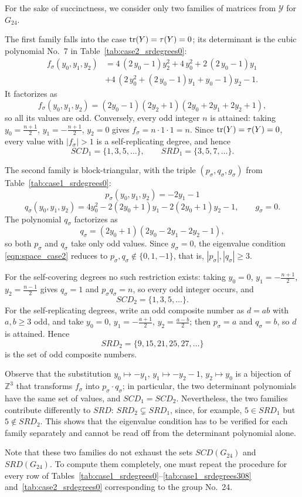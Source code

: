 For the sake of succinctness, we consider only two families of matrices from $\mathcal{Y}$ for $G_{24}$.

The first family falls into the case $\operatorname{tr}(Y) = \tau(Y) = 0$; its determinant is the cubic polynomial
No.~7 in Table~\ref{tab:case2_srdegrees0}:
\begin{align*}
f_\sigma(y_0, y_1, y_2) &= 4 \, {\left(2 \, y_{0} - 1\right)} y_{2}^{2} + 4 \, y_{0}^{2} + 2 \, {\left(2 \, y_{0} - 1\right)} y_{1} \\
& + 4 \, {\left(2 \, y_{0}^{2} + {\left(2 \, y_{0} - 1\right)} y_{1} + y_{0} - 1\right)} y_{2} - 1.
\end{align*}
It factorizes as
$$
f_\sigma(y_0, y_1, y_2) = (2y_0 - 1)(2y_2 + 1)(2y_0 + 2y_1 + 2y_2 + 1),
$$
so all its values are odd. Conversely, every odd integer $n$ is attained: taking
$y_0 = \frac{n+1}{2}$, $y_1 = -\frac{n+1}{2}$, $y_2 = 0$ gives $f_\sigma = n \cdot 1 \cdot 1 = n$.
Since $\operatorname{tr}(Y) = \tau(Y) = 0$, every value with $|f_\sigma| > 1$ is a self-replicating degree, and hence
$$
SCD_1 = \{1, 3, 5, \dots\}, \qquad SRD_1 = \{3, 5, 7, \dots\}.
$$

The second family is block-triangular, with the triple $(p_\sigma, q_\sigma, g_\sigma)$ from
Table~\ref{tab:case1_srdegrees0}:
$$
p_\sigma(y_0, y_1, y_2) = -2 y_1 - 1
$$
$$
q_\sigma(y_0, y_1, y_2) = 4 y_0^2 - 2(2 y_0 + 1) y_1 - 2 (2 y_0 + 1) y_2 - 1, \qquad
g_\sigma = 0.
$$
The polynomial $q_\sigma$ factorizes as
$$
q_\sigma = (2y_0 + 1)(2y_0 - 2y_1 - 2y_2 - 1),
$$
so both $p_\sigma$ and $q_\sigma$ take only odd values. Since $g_\sigma = 0$, the eigenvalue condition
\eqref{eqn:space_case2} reduces to $p_\sigma, q_\sigma \notin \{0, 1, -1\}$, that is,
$|p_\sigma|, |q_\sigma| \ge 3$.

For the self-covering degrees no such restriction exists: taking $y_0 = 0$, $y_1 = -\frac{n+1}{2}$,
$y_2 = \frac{n-1}{2}$ gives $q_\sigma = 1$ and $p_\sigma q_\sigma = n$, so every odd integer occurs, and
$$
SCD_2 = \{1, 3, 5, \dots\}.
$$
For the self-replicating degrees, write an odd composite number as $d = ab$ with $a, b \ge 3$ odd, and take
$y_0 = 0$, $y_1 = -\frac{a+1}{2}$, $y_2 = \frac{a-b}{2}$; then $p_\sigma = a$ and $q_\sigma = b$, so $d$ is
attained. Hence
$$
SRD_2 = \{9, 15, 21, 25, 27, \dots\}
$$
is the set of odd composite numbers.

Observe that the substitution $y_0 \mapsto -y_1$, $y_1 \mapsto -y_2 - 1$, $y_2 \mapsto y_0$ is a bijection of
$\mathbb{Z}^3$ that transforms $f_\sigma$ into $p_\sigma \cdot q_\sigma$; in particular, the two determinant
polynomials have the same set of values, and $SCD_1 = SCD_2$. Nevertheless, the two families contribute
differently to $SRD$: $SRD_2 \subsetneq SRD_1$, since, for example, $5 \in SRD_1$ but $5 \notin SRD_2$.
This shows that the eigenvalue condition has to be verified for each family separately and cannot be read off
from the determinant polynomial alone.

Note that these two families do not exhaust the sets $SCD(G_{24})$ and $SRD(G_{24})$. To compute them
completely, one must repeat the procedure for every row of
Tables~\ref{tab:case1_srdegrees0}--\ref{tab:case1_srdegrees308} and~\ref{tab:case2_srdegrees0} corresponding
to the group No.~24.
